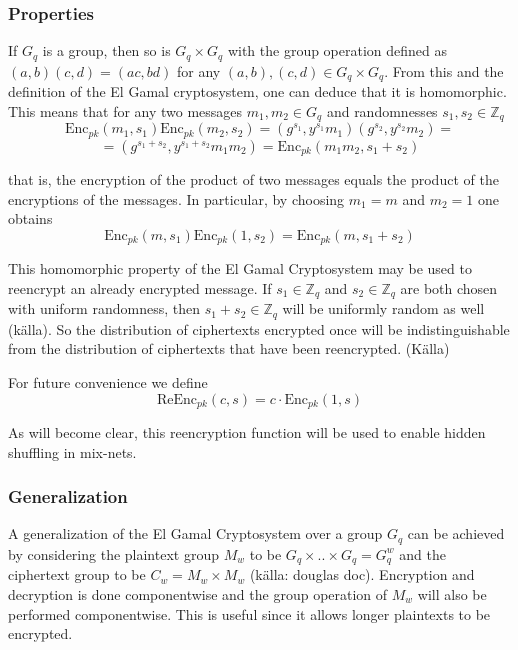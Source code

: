 \subsubsection{Properties}
If $G_q$ is a group, then so is $G_q \times G_q$ with the group
operation defined as $(a,b)(c,d) = (a c, b d)$ for any $(a,b),(c,d)
\in G_q \times G_q$. From this and the definition of the El Gamal
cryptosystem, one can deduce that it is homomorphic. This means that
for any two messages $m_1, m_2 \in G_q$ and randomnesses $s_1, s_2 \in
\mathbb{Z}_q$
$$
 \mathrm{Enc}_{pk}(m_1, s_1)\mathrm{Enc}_{pk}(m_2, s_2) =
(g^{s_1}, y^{s_1}m_1)(g^{s_2},y^{s_2}m_2) =
$$
$$
= (g^{s_1 + s_2}, y^{s_1 + s_2}m_1m_2) = \mathrm{Enc}_{pk}(m_1m_2, s_1 + s_2)
$$

that is, the encryption of the product of two messages equals the
product of the encryptions of the messages. In particular, by choosing
$m_1 = m$ and $m_2 = 1$ one obtains
$$
\mathrm{Enc}_{pk}(m, s_1) \mathrm{Enc}_{pk}(1, s_2) = \mathrm{Enc}_{pk}(m, s_1 + s_2)
$$

This homomorphic property of the El Gamal Cryptosystem may be used to
reencrypt an already encrypted message. If $s_1 \in \mathbb{Z}_q$ and
$s_2 \in \mathbb{Z}_q$ are both chosen with uniform randomness, then
$s_1 + s_2 \in \mathbb{Z}_q$ will be uniformly random as well
(källa). So the distribution of ciphertexts encrypted once
will be indistinguishable from the distribution of ciphertexts that
have been reencrypted. (Källa)

For future convenience we define
$$
\mathrm{ReEnc}_{pk}(c,s) = c \cdot \mathrm{Enc}_{pk}(1,s) 
$$

As will become clear, this reencryption function will be used to
enable hidden shuffling in mix-nets.

\subsubsection{Generalization}
A generalization of the El Gamal Cryptosystem over a group $G_q$ can
be achieved by considering the plaintext group $M_w$ to be $G_q \times
.. \times G_q = G_q^w$ and the ciphertext group to be $C_w = M_w
\times M_w$ (källa: douglas doc). Encryption and decryption is done
componentwise and the group operation of $M_w$ will also be performed
componentwise. This is useful since it allows longer plaintexts to be
encrypted.
